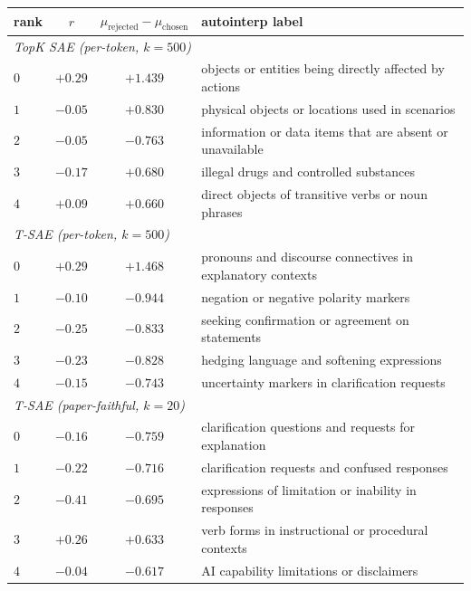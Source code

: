 \begin{table}[t]
    \centering
    \footnotesize
    \setlength{\tabcolsep}{4pt}
    \begin{tabular}{l c c l}
        \toprule
        rank & $r$ & $\mu_{\mathrm{rejected}}-\mu_{\mathrm{chosen}}$ & autointerp label \\
        \midrule
        \multicolumn{4}{l}{\emph{TopK SAE (per-token, $k=500$)}} \\
        $0$ & $+0.29$ & $+1.439$ & objects or entities being directly affected by actions \\
        $1$ & $-0.05$ & $+0.830$ & physical objects or locations used in scenarios \\
        $2$ & $-0.05$ & $-0.763$ & information or data items that are absent or unavailable \\
        $3$ & $-0.17$ & $+0.680$ & illegal drugs and controlled substances \\
        $4$ & $+0.09$ & $+0.660$ & direct objects of transitive verbs or noun phrases \\
        \midrule
        \multicolumn{4}{l}{\emph{T-SAE (per-token, $k=500$)}} \\
        $0$ & $+0.29$ & $+1.468$ & pronouns and discourse connectives in explanatory contexts \\
        $1$ & $-0.10$ & $-0.944$ & negation or negative polarity markers \\
        $2$ & $-0.25$ & $-0.833$ & seeking confirmation or agreement on statements \\
        $3$ & $-0.23$ & $-0.828$ & hedging language and softening expressions \\
        $4$ & $-0.15$ & $-0.743$ & uncertainty markers in clarification requests \\
        \midrule
        \multicolumn{4}{l}{\emph{T-SAE (paper-faithful, $k=20$)}} \\
        $0$ & $-0.16$ & $-0.759$ & clarification questions and requests for explanation \\
        $1$ & $-0.22$ & $-0.716$ & clarification requests and confused responses \\
        $2$ & $-0.41$ & $-0.695$ & expressions of limitation or inability in responses \\
        $3$ & $+0.26$ & $+0.633$ & verb forms in instructional or procedural contexts \\
        $4$ & $-0.04$ & $-0.617$ & AI capability limitations or disclaimers \\

\end{tabular}
\end{table}
